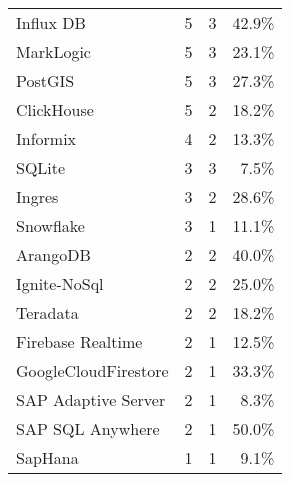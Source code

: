 \begin{tabular}{lrrr}
               Influx DB &                           5 &           3 &       42.9\% \\
               MarkLogic &                           5 &           3 &       23.1\% \\
                 PostGIS &                           5 &           3 &       27.3\% \\
              ClickHouse &                           5 &           2 &       18.2\% \\
                Informix &                           4 &           2 &       13.3\% \\
                  SQLite &                           3 &           3 &        7.5\% \\
                  Ingres &                           3 &           2 &       28.6\% \\
               Snowflake &                           3 &           1 &       11.1\% \\
                ArangoDB &                           2 &           2 &       40.0\% \\
            Ignite-NoSql &                           2 &           2 &       25.0\% \\
                Teradata &                           2 &           2 &       18.2\% \\
       Firebase Realtime &                           2 &           1 &       12.5\% \\
    GoogleCloudFirestore &                           2 &           1 &       33.3\% \\
     SAP Adaptive Server &                           2 &           1 &        8.3\% \\
        SAP SQL Anywhere &                           2 &           1 &       50.0\% \\
                 SapHana &                           1 &           1 &        9.1\% \\
\hline
\end{tabular}
